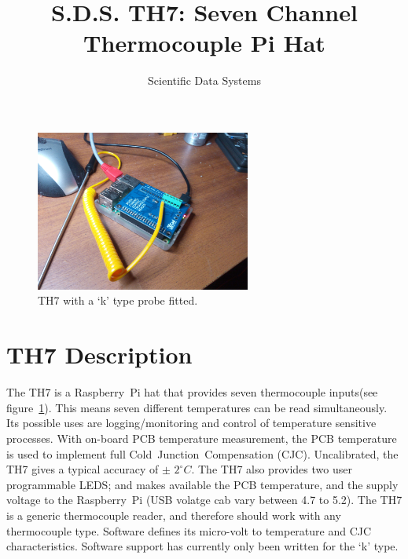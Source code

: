 \documentclass[10pt,foldmark]{leaflet}
\title{S.D.S. TH7: Seven Channel Thermocouple  Pi Hat}
\author{Scientific Data Systems}
\begin{document}
\maketitle

\begin{figure}
 \centering
 \includegraphics[width=200pt]{./TH7_0p4_IMG_20181010_184556D.jpg}
 \caption{TH7 with a `k' type probe fitted.}
 \label{fig:th7}
\end{figure}



\section{TH7 Description}
%
The TH7 is a Raspberry~Pi hat   that
provides seven thermocouple inputs(see figure~\ref{fig:th7}).
%
This means seven different temperatures can be read
simultaneously. 
%
Its possible uses are 
logging/monitoring and control of temperature sensitive processes.
%
With on-board PCB temperature measurement, 
the PCB temperature
is used to implement
full Cold~Junction~Compensation (CJC).
%
Uncalibrated, the TH7 gives a typical accuracy of $\pm$ ${2}^{\circ} C$.
%
The TH7 also provides two user programmable LEDS; and 
makes available the PCB temperature, and the supply voltage to the Raspberry~Pi (USB volatge cab vary between 4.7 to 5.2).
\clearpage
The TH7 is a generic thermocouple reader, and therefore should work with any thermocouple type.
%
Software defines its micro-volt to temperature and CJC characteristics.
Software support has currently only been written for the `k' type.

\end{document}
